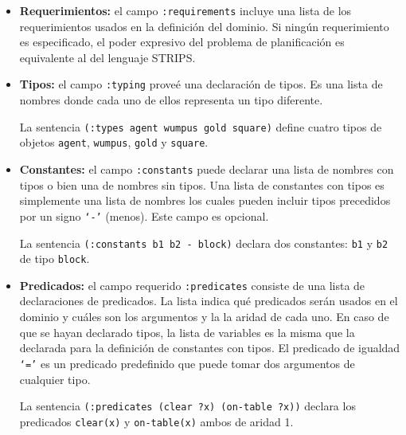 \begin{itemize}

\item {\bf Requerimientos:} el campo \texttt{:requirements} incluye una lista 
de los requerimientos usados en la definici\'on del dominio. 
Si ning\'un requerimiento es especificado, el poder expresivo 
del problema de planificaci\'on es equivalente al del lenguaje STRIPS.

\item {\bf Tipos:} el campo \texttt{:typing} prove\'e una declaraci\'on de tipos. 
Es una lista de nombres donde cada uno de ellos 
representa un tipo diferente.

\begin{ejemplo}%

La sentencia \texttt{(:types agent wumpus gold square)} 
define cuatro tipos de objetos 
\texttt{agent}, \texttt{wumpus}, \texttt{gold} y \texttt{square}.

\end{ejemplo}

\item {\bf Constantes:} el campo \texttt{:constants} puede declarar una lista de nombres 
con tipos o bien una de nombres sin tipos. Una lista de constantes 
con tipos es simplemente una lista de nombres los cuales pueden incluir tipos 
precedidos por un signo \texttt{`-'} (menos). Este campo es opcional.

\begin{ejemplo}%

La sentencia \texttt{(:constants b1 b2 - block)} declara dos constantes:
\texttt{b1} y \texttt{b2} de tipo \texttt{block}. 

\end{ejemplo}

\item {\bf Predicados:} el campo requerido \texttt{:predicates} 
consiste de una lista de declaraciones de predicados. 
La lista indica qu\'e predicados ser\'an usados en el dominio y
cu\'ales son los argumentos y la la aridad de cada uno. 
En caso de que se hayan declarado tipos, 
la lista de variables es la misma que la declarada 
para la definici\'on de constantes con tipos. 
El predicado de igualdad \texttt{`='} es un predicado predefinido 
que puede tomar dos argumentos de cualquier tipo.

\begin{ejemplo}%

La sentencia \texttt{(:predicates (clear ?x) (on-table ?x))} declara los pre\-di\-ca\-dos 
\texttt{clear(x)} y \texttt{on-table(x)} ambos de aridad 1. 


\end{ejemplo}
\end{itemize}
